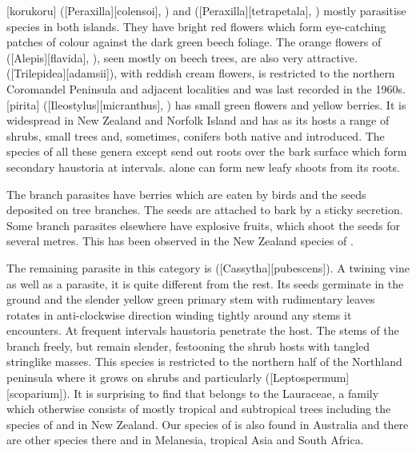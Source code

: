 [korukoru] ([Peraxilla][colensoi], ) and  ([Peraxilla][tetrapetala], ) mostly parasitise  species in both islands.
They have bright red flowers which form eye-catching patches of colour against the dark green beech foliage.
The orange flowers of  ([Alepis][flavida], ), seen mostly on beech trees, are also very attractive.  ([Trilepidea][adamsii]), with reddish cream flowers, is restricted to the northern Coromandel Peninsula and adjacent localities and was last recorded in the 1960s. [pirita] ([Ileostylus][micranthus], ) has small green flowers and yellow berries.
It is widespread in New Zealand and Norfolk Island and has as its hosts a range of shrubs, small trees and, sometimes, conifers both native and introduced.
The species of all these genera except  send out roots over the bark surface which form secondary haustoria at intervals.  alone can form new leafy shoots from its roots.

The branch parasites have berries which are eaten by birds and the seeds deposited on tree branches.
The seeds are attached to bark by a sticky secretion.
Some branch parasites elsewhere have explosive fruits, which shoot the seeds for several metres.
This has been observed in the New Zealand species of .

The remaining parasite in this category is  ([Cassytha][pubescens]).
A twining vine as well as a parasite, it is quite different from the rest.
Its seeds germinate in the ground and the slender yellow green primary stem with rudimentary leaves rotates in anti-clockwise direction winding tightly around any stems it encounters.
At frequent intervals haustoria penetrate the host.
The stems of the  branch freely, but remain slender, festooning the shrub hosts with tangled stringlike masses.
This species is restricted to the northern half of the Northland peninsula where it grows on shrubs and particularly  ([Leptospermum][scoparium]).
It is surprising to find that  belongs to the Lauraceae, a family which otherwise consists of mostly tropical and subtropical trees including the species of  and  in New Zealand.
Our species of  is also found in Australia and there are other species there and in Melanesia, tropical Asia and South Africa.

